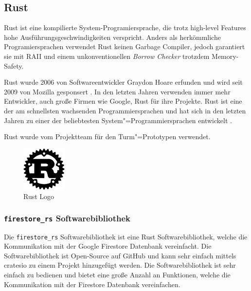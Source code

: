 \subsection{Rust}
\label{sec:rust}

Rust ist eine \gls{kompiliert}e System-Programiersprache, die trotz \gls{high-level} Features hohe Ausführungsgeschwindigkeiten verspricht. Anders als herkömmliche Programiersprachen verwendet Rust keinen Garbage Compiler, jedoch garantiert sie mit \ac{RAII} und einem unkonventionellen \textit{Borrow Checker} trotzdem \Gls{Memory-Safety}.

\bigskip


\noindent Rust wurde 2006 von Softwareentwickler Graydon Hoare erfunden und wird seit 2009 von Mozilla gesponsert . In den letzten Jahren verwenden immer mehr Entwickler, auch große Firmen wie Google, Rust für ihre Projekte. Rust ist eine der am schnellsten wachsenden Programmiersprachen und hat sich in den letzten Jahren zu einer der beliebtesten System"=Programmiersprachen entwickelt .

\noindent Rust wurde vom Projektteam für den Turm"=Prototypen verwendet.

\begin{figure}[H]
    \centering
    \includegraphics[width=0.20\textwidth]{images/rust_logo.png}
    \caption{Rust Logo}
    \label{fig:rust_logo}
\end{figure}

\subsubsection{\texttt{firestore\_rs} Softwarebibliothek}
\label{sec:firestore_rs}

Die \texttt{firestore\_rs} Softwarebibliothek ist eine Rust Softwarebibliothek, welche die Kommunikation mit der Google Firestore Datenbank vereinfacht. Die Softwarebibliothek ist \Gls{Open-Source} auf GitHub und kann sehr einfach mittels \gls{cratesio} zu einem Projekt hinzugefügt werden. Die Softwarebibliothek ist sehr einfach zu bedienen und bietet eine große Anzahl an Funktionen, welche die Kommunikation mit der Firestore Datenbank vereinfachen.


